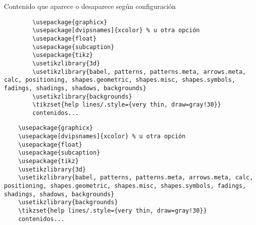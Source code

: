 \documentclass[12pt,letterpaper]{article}
\begin{document}
\vspace{5mm}

\begin{comment}
	Este texto largo con fórmulas $x^2$, 
	tablas, figuras, etc. será completamente 
	ignorado durante la compilación.
\end{comment}


\begin{notas}
	
	Contenido que aparece o desaparece según configuración
	
	\begin{verbatim}
		\usepackage{graphicx}
		\usepackage[dvipsnames]{xcolor} % u otra opción
		\usepackage{float}
		\usepackage{subcaption}
		\usepackage{tikz}
		\usetikzlibrary{3d}
		\usetikzlibrary{babel, patterns, patterns.meta, arrows.meta, calc, positioning, shapes.geometric, shapes.misc, shapes.symbols, fadings, shadings, shadows, backgrounds}
		\usetikzlibrary{backgrounds}
		\tikzset{help lines/.style={very thin, draw=gray!30}}
		contenidos...
	\end{verbatim}
\end{notas}

	\begin{verbatim}
	\usepackage{graphicx}
	\usepackage[dvipsnames]{xcolor} % u otra opción
	\usepackage{float}
	\usepackage{subcaption}
	\usepackage{tikz}
	\usetikzlibrary{3d}
	\usetikzlibrary{babel, patterns, patterns.meta, arrows.meta, calc, positioning, shapes.geometric, shapes.misc, shapes.symbols, fadings, shadings, shadows, backgrounds}
	\usetikzlibrary{backgrounds}
	\tikzset{help lines/.style={very thin, draw=gray!30}}
	contenidos...
\end{verbatim}

	
\end{document}
